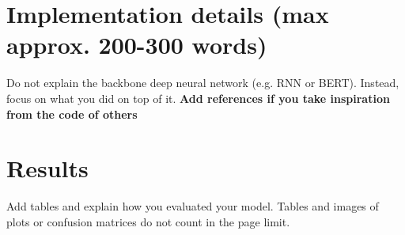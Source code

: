 \documentclass[a4paper]{article}
\begin{document}
\section{Implementation details (max approx. 200-300 words)}
Do not explain the backbone deep neural network (e.g. RNN or BERT). Instead, focus on what you did on top of it. \textbf{Add references if you take inspiration from the code of others}

\section{Results}
Add tables and explain how you evaluated your model. Tables and images of plots or confusion matrices do not count in the page limit.





\end{document}
